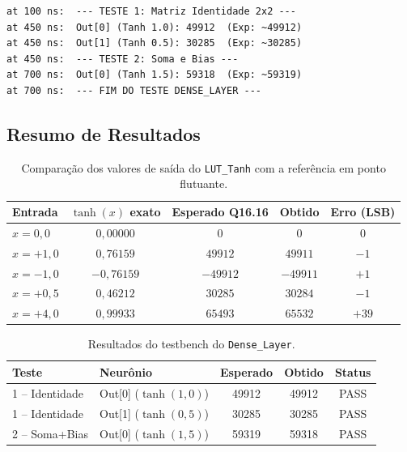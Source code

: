\documentclass[a4paper,12pt]{article}
\begin{document}
\begin{lstlisting}[style=logstyle,
    caption={Sa\'ida do ISim para o testbench do \texttt{Dense\_Layer}.},
    label={lst:log_dense}]
at 100 ns:  --- TESTE 1: Matriz Identidade 2x2 ---
at 450 ns:  Out[0] (Tanh 1.0): 49912  (Exp: ~49912)
at 450 ns:  Out[1] (Tanh 0.5): 30285  (Exp: ~30285)
at 450 ns:  --- TESTE 2: Soma e Bias ---
at 700 ns:  Out[0] (Tanh 1.5): 59318  (Exp: ~59319)
at 700 ns:  --- FIM DO TESTE DENSE_LAYER ---
\end{lstlisting}

\subsection{Resumo de Resultados}

\begin{table}[H]
\centering
\caption{Compara\c{c}\~ao dos valores de sa\'ida do \texttt{LUT\_Tanh} com a refer\^encia em ponto flutuante.}
\small
\begin{tabular}{lcccc}
\hline
\textbf{Entrada} & \textbf{$\tanh(x)$ exato} & \textbf{Esperado Q16.16} & \textbf{Obtido} & \textbf{Erro (LSB)} \\
\hline
$x = 0{,}0$  & $0{,}00000$ & $0$     & $0$      & $0$      \\
$x = +1{,}0$ & $0{,}76159$ & $49912$ & $49911$  & $-1$     \\
$x = -1{,}0$ & $-0{,}76159$& $-49912$& $-49911$ & $+1$     \\
$x = +0{,}5$ & $0{,}46212$ & $30285$ & $30284$  & $-1$     \\
$x = +4{,}0$ & $0{,}99933$ & $65493$ & $65532$  & $+39$    \\
\hline
\end{tabular}
\end{table}

\begin{table}[H]
\centering
\caption{Resultados do testbench do \texttt{Dense\_Layer}.}
\small
\begin{tabular}{llccc}
\hline
\textbf{Teste} & \textbf{Neur\^onio} & \textbf{Esperado} & \textbf{Obtido} & \textbf{Status} \\
\hline
1 -- Identidade & Out{[}0{]} ($\tanh(1{,}0)$) & 49912 & 49912 & PASS \\
1 -- Identidade & Out{[}1{]} ($\tanh(0{,}5)$) & 30285 & 30285 & PASS \\
2 -- Soma+Bias  & Out{[}0{]} ($\tanh(1{,}5)$) & 59319 & 59318 & PASS \\
\hline
\end{tabular}
\end{table}
\end{document}
